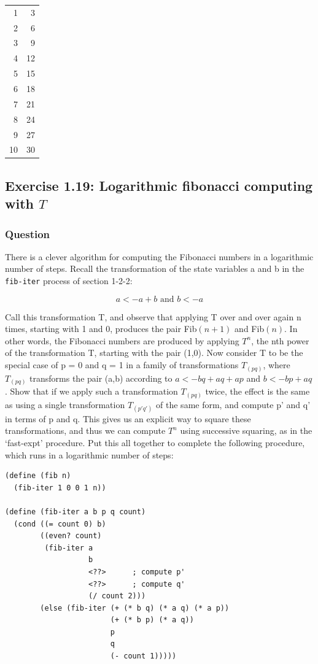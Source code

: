 \documentclass[final,fleqn,titlepage,twoside]{article}
\begin{document}
\begin{center}
\begin{tabular}{rr}
1 & 3\\[0pt]
2 & 6\\[0pt]
3 & 9\\[0pt]
4 & 12\\[0pt]
5 & 15\\[0pt]
6 & 18\\[0pt]
7 & 21\\[0pt]
8 & 24\\[0pt]
9 & 27\\[0pt]
10 & 30\\[0pt]
\end{tabular}
\end{center}

\subsection{Exercise 1.19: Logarithmic fibonacci computing with \(T\)}
\label{sec:org2174a12}
\subsubsection{Question}
\label{sec:orgfb73b1d}
There is a clever algorithm for computing the Fibonacci numbers in a logarithmic
number of steps. Recall the transformation of the state variables a and b in the
\texttt{fib-iter} process of section 1-2-2:

\[a <- a + b\text{ and }b <- a\]

Call this transformation T, and observe that applying T over and over again n
times, starting with 1 and 0, produces the pair Fib\((n + 1)\) and Fib\((n)\). In
other words, the Fibonacci numbers are produced by applying \(T^n\), the nth
power of the transformation T, starting with the pair (1,0). Now consider T to
be the special case of p = 0 and q = 1 in a family of transformations \(T_{(pq)}\), where \(T_{(pq)}\) transforms the pair (a,b) according to \(a <-
bq + aq + ap\) and \(b <- bp + aq\). Show that if we apply such a
transformation \(T_{(pq)}\) twice, the effect is the same as using a single
transformation \(T_{(p'q')}\) of the same form, and compute p' and q' in terms
of p and q. This gives us an explicit way to square these transformations, and
thus we can compute \(T^n\) using successive squaring, as in the `fast-expt'
procedure. Put this all together to complete the following procedure, which runs
in a logarithmic number of steps:
\begin{verbatim}
(define (fib n)
  (fib-iter 1 0 0 1 n))

(define (fib-iter a b p q count)
  (cond ((= count 0) b)
        ((even? count)
         (fib-iter a
                   b
                   <??>      ; compute p'
                   <??>      ; compute q'
                   (/ count 2)))
        (else (fib-iter (+ (* b q) (* a q) (* a p))
                        (+ (* b p) (* a q))
                        p
                        q
                        (- count 1)))))
\end{verbatim}
\end{document}
